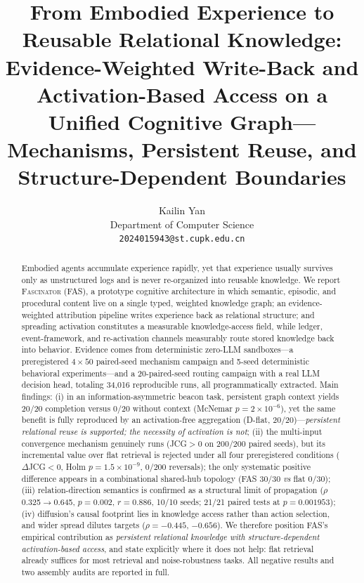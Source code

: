 \documentclass[10pt,a4paper]{article}
\title{\bfseries From Embodied Experience to Reusable Relational Knowledge:\\ Evidence-Weighted Write-Back and Activation-Based Access on a\\ Unified Cognitive Graph---Mechanisms, Persistent Reuse, and Structure-Dependent Boundaries}
\author{Kailin Yan\\ \small Department of Computer Science\\ \small \texttt{2024015943@st.cupk.edu.cn}}
\date{}
\begin{document}
\maketitle

\begin{abstract}
Embodied agents accumulate experience rapidly, yet that experience usually survives only as unstructured logs and is never re-organized into reusable knowledge. We report \textsc{Fascinator} (FAS), a prototype cognitive architecture in which semantic, episodic, and procedural content live on a single typed, weighted knowledge graph; an evidence-weighted attribution pipeline writes experience back as relational structure; and spreading activation constitutes a measurable knowledge-access field, while ledger, event-framework, and re-activation channels measurably route stored knowledge back into behavior. Evidence comes from deterministic zero-LLM sandboxes---a preregistered $4\times50$ paired-seed mechanism campaign and 5-seed deterministic behavioral experiments---and a 20-paired-seed routing campaign with a real LLM decision head, totaling 34{,}016 reproducible runs, all programmatically extracted. Main findings: (i) in an information-asymmetric beacon task, persistent graph context yields 20/20 completion versus 0/20 without context (McNemar $p{=}2\times10^{-6}$), yet the same benefit is fully reproduced by an activation-free aggregation (D-flat, 20/20)---\emph{persistent relational reuse is supported; the necessity of activation is not}; (ii) the multi-input convergence mechanism genuinely runs (JCG${>}0$ on 200/200 paired seeds), but its incremental value over flat retrieval is rejected under all four preregistered conditions ($\Delta$JCG${<}0$, Holm $p{=}1.5\times10^{-9}$, 0/200 reversals); the only systematic positive difference appears in a combinational shared-hub topology (FAS 30/30 \emph{vs} flat 0/30); (iii) relation-direction semantics is confirmed as a structural limit of propagation ($\rho$ 0.325$\rightarrow$0.645, $p{=}0.002$, $r{=}0.886$, 10/10 seeds; 21/21 paired tests at $p{=}0.001953$); (iv) diffusion's causal footprint lies in knowledge access rather than action selection, and wider spread dilutes targets ($\rho{=}{-}0.445$, ${-}0.656$). We therefore position FAS's empirical contribution as \emph{persistent relational knowledge with structure-dependent activation-based access}, and state explicitly where it does not help: flat retrieval already suffices for most retrieval and noise-robustness tasks. All negative results and two assembly audits are reported in full.
\end{abstract}
\end{document}

